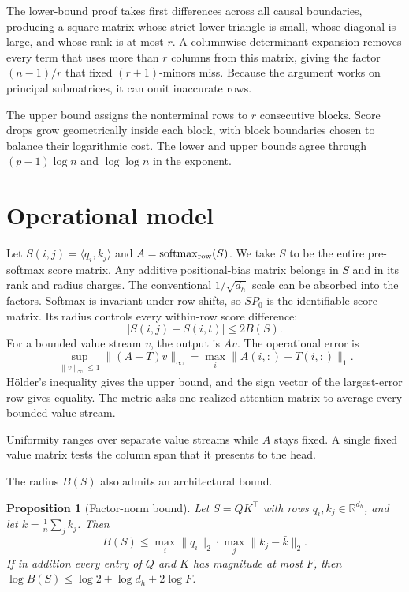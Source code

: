 \documentclass[10pt]{article}
\newtheorem{proposition}[theorem]{Proposition}
\theoremstyle{definition}
\newcommand{\R}{\mathbb R}
\newcommand{\softmax}{\operatorname{softmax}}
\begin{document}
The lower-bound proof takes first differences across all causal boundaries,
producing a square matrix whose strict lower triangle is small, whose diagonal
is large, and whose rank is at most \(r\).  A columnwise determinant expansion
removes every term that uses more than \(r\) columns from this matrix, giving
the factor \((n-1)/r\) that fixed \((r+1)\)-minors miss.  Because the argument
works on principal submatrices, it can omit inaccurate rows.

The upper bound assigns the nonterminal rows to \(r\) consecutive blocks.
Score drops grow geometrically inside each block, with block boundaries chosen
to balance their logarithmic cost.  The lower and upper bounds agree through
\((p-1)\log n\) and \(\log\log n\) in the exponent.

\section{Operational model}

Let \(S(i,j)=\langle q_i,k_j\rangle\) and
\(A=\softmax_{\rm row}(S)\).  We take \(S\) to be the entire pre-softmax
score matrix.  Any additive positional-bias matrix belongs in \(S\) and in
its rank and radius charges.  The conventional
\(1/\sqrt{d_h}\) scale can be absorbed into the factors.  Softmax is invariant
under row shifts, so
\(SP_0\) is the identifiable score matrix.  Its radius controls every
within-row score difference:
\[
 |S(i,j)-S(i,t)|\le 2B(S).
\]
For a bounded value stream \(v\), the output is \(Av\).  The operational
error is
\begin{equation}\label{eq:operator}
 \sup_{\|v\|_\infty\le1}\|(A-T)v\|_\infty
 =\max_i\|A(i,:)-T(i,:)\|_1 .
\end{equation}
H\"older's inequality gives the upper bound, and the sign vector of the
largest-error row gives equality.  The metric asks one realized attention
matrix to average every bounded value stream.

Uniformity ranges over separate value streams while \(A\) stays fixed.  A
single fixed value matrix tests the column span that it presents to the head.

The radius \(B(S)\) also admits an architectural bound.

\begin{proposition}[Factor-norm bound]\label{prop:norms}
Let \(S=QK^\top\) with rows \(q_i,k_j\in\R^{d_h}\), and let
\(\bar k=\frac1n\sum_jk_j\).  Then
\begin{equation}\label{eq:norms}
 B(S)\le\max_i\|q_i\|_2\cdot\max_j\|k_j-\bar k\|_2 .
\end{equation}
If in addition every entry of \(Q\) and \(K\) has magnitude at most \(F\),
then \(\log B(S)\le\log 2+\log d_h+2\log F\).
\end{proposition}
\end{document}
